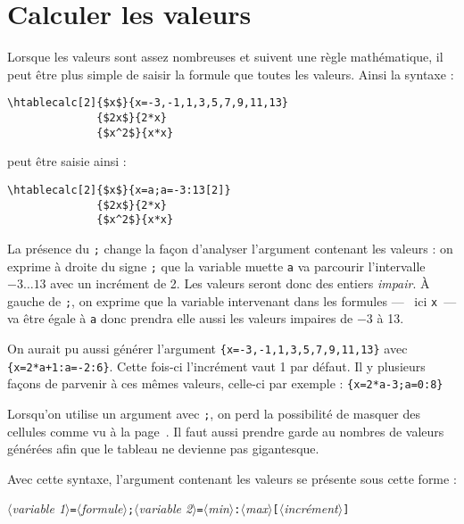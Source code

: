 \documentclass[a4paper,10pt]{article}
\newcommand\argu[1]{$\langle$\textit{#1}$\rangle$}
\newcommand\arguC[1]{\texttt{[}\argu{#1}\texttt{]}}
\newcommand\mywidth{0.85\linewidth}
\begin{document}
\section{Calculer les valeurs}
Lorsque les valeurs sont assez nombreuses et suivent une règle mathématique, il peut être plus simple de saisir la formule que toutes les valeurs. Ainsi la syntaxe :
\begin{center}
\begin{minipage}{\mywidth}
\begin{lstlisting}
\htablecalc[2]{$x$}{x=-3,-1,1,3,5,7,9,11,13}
              {$2x$}{2*x}
              {$x^2$}{x*x}
\end{lstlisting}
\end{minipage}
\end{center}
peut être saisie ainsi :
\begin{center}
\begin{minipage}{\mywidth}
\begin{lstlisting}
\htablecalc[2]{$x$}{x=a;a=-3:13[2]}
              {$2x$}{2*x}
              {$x^2$}{x*x}
\end{lstlisting}
\end{minipage}
\end{center}
La présence du \og\verb=;=\fg{} change la façon d'analyser l'argument contenant les valeurs : on exprime à droite du signe \og\verb=;=\fg{} que la variable muette \og\verb=a=\fg{} va parcourir l'intervalle $-3\ldots13$ avec un incrément de 2. Les valeurs seront donc des entiers \emph{impair}. À gauche de \og\verb=;=\fg{}, on exprime que la variable intervenant dans les formules ---~ ici \verb=x=~--- va être égale à \verb=a= donc prendra elle aussi les valeurs impaires de $-3$ à 13.

On aurait pu aussi générer l'argument \verb|{x=-3,-1,1,3,5,7,9,11,13}| avec  \verb|{x=2*a+1:a=-2:6}|. Cette fois-ci l'incrément vaut 1 par défaut. Il y plusieurs façons de parvenir à ces mêmes valeurs, celle-ci par exemple : \verb|{x=2*a-3;a=0:8}|\bigskip

Lorsqu'on utilise un argument avec \og\verb=;=\fg{}, on perd la possibilité de masquer des cellules comme vu à la page~\pageref{masquercellules}. Il faut aussi prendre garde au nombres de valeurs générées afin que le tableau ne devienne pas gigantesque.\medskip

Avec cette syntaxe, l'argument contenant les valeurs se présente sous cette forme :\par\smallskip\nobreak
\hfill\argu{variable 1}\verb|=|\argu{formule}\verb|;|\argu{variable 2}\verb|=|\argu{min}\verb|:|\argu{max}\arguC{incrément}\hfill{}\smallskip
\end{document}
